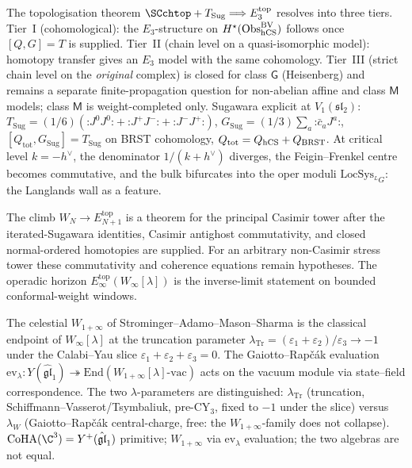 \begin{remark}
\label{rem:v2-preface-three-tier-topologisation}
The topologisation theorem
$\SCchtop + T_{\mathrm{Sug}} \Longrightarrow E_3^{\mathrm{top}}$
resolves into three tiers. Tier~I (cohomological): the
$E_3$-structure on $H^\star(\mathrm{Obs}_{\mathrm{hCS}}^{\mathrm{BV}})$
follows once $[Q,G]=T$ is supplied. Tier~II (chain level on a
quasi-isomorphic model): homotopy transfer gives an $E_3$ model
with the same cohomology. Tier~III (strict chain level on the
\emph{original} complex) is closed for class $\mathsf G$
(Heisenberg) and remains a separate finite-propagation question
for non-abelian affine and class $\mathsf M$ models; class
$\mathsf M$ is weight-completed only. Sugawara explicit
at $V_1(\mathfrak{sl}_2)$:
$T_{\mathrm{Sug}} = (1/6)(\mathord{:}J^0J^0\mathord{:}
+\mathord{:}J^+J^-\mathord{:}+\mathord{:}J^-J^+\mathord{:})$,
$G_{\mathrm{Sug}} = (1/3)\sum_a\mathord{:}\bar c_a J^a\mathord{:}$,
$[Q_{\mathrm{tot}},G_{\mathrm{Sug}}]=T_{\mathrm{Sug}}$ on BRST
cohomology, $Q_{\mathrm{tot}}=Q_{\mathrm{hCS}}+Q_{\mathrm{BRST}}$. At
critical level $k=-h^\vee$, the denominator $1/(k+h^\vee)$
diverges, the Feigin--Frenkel centre becomes commutative, and
the bulk bifurcates into the oper moduli $\mathrm{LocSys}_{^LG}$:
the Langlands wall as a feature.
\end{remark}

\begin{remark}
\label{rem:v2-preface-wn-en1-top-scope}
The climb $W_N\to E_{N+1}^{\mathrm{top}}$ is a theorem for the
principal Casimir tower after the iterated-Sugawara identities,
Casimir antighost commutativity, and closed normal-ordered
homotopies are supplied. For an arbitrary non-Casimir stress tower
these commutativity and coherence equations remain hypotheses. The
operadic horizon $E_\infty^{\mathrm{top}}(W_\infty[\lambda])$ is
the inverse-limit statement on bounded conformal-weight windows.
\end{remark}

\begin{remark}
\label{rem:v2-preface-celestial-w1inf-classical}
The celestial $W_{1+\infty}$ of Strominger--Adamo--Mason--Sharma
is the classical endpoint of $W_\infty[\lambda]$ at the
truncation parameter $\lambda_{\mathrm{Tr}}=(\varepsilon_1+\varepsilon_2)/\varepsilon_3
\to -1$ under the Calabi--Yau slice
$\varepsilon_1+\varepsilon_2+\varepsilon_3=0$. The Gaiotto--Rap\v c\'ak
evaluation $\mathrm{ev}_\lambda\colon Y(\hat{\mathfrak{gl}}_1)
\twoheadrightarrow \mathrm{End}(W_{1+\infty}[\lambda]\text{-vac})$
acts on the vacuum module via state--field correspondence. The two
$\lambda$-parameters are distinguished: $\lambda_{\mathrm{Tr}}$
(truncation, Schiffmann--Vasserot/Tsymbaliuk, pre-CY$_3$, fixed to
$-1$ under the slice) versus $\lambda_W$ (Gaiotto--Rap\v c\'ak
central-charge, free: the $W_{1+\infty}$-family does not collapse).
$\mathrm{CoHA}(\C^3) = Y^+(\hat{\mathfrak{gl}}_1)$ primitive;
$W_{1+\infty}$ via $\mathrm{ev}_\lambda$ evaluation; the two
algebras are not equal.
\end{remark}

